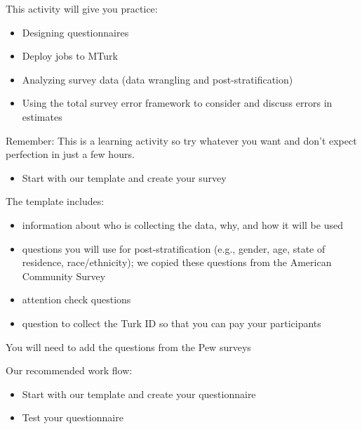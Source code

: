 \documentclass[aspectratio=169]{beamer}
\begin{document}
\begin{frame}

This activity will give you practice:
\begin{itemize}
\item Designing questionnaires
\pause
\item Deploy jobs to MTurk
\pause
\item Analyzing survey data (data wrangling and post-stratification)
\pause
\item Using the total survey error framework to consider and discuss errors in estimates
\pause
\end{itemize}

\vfill
Remember: This is a learning activity so try whatever you want and don't expect perfection in just a few hours.

\end{frame}
\begin{frame}

\begin{itemize}
\item Start with our template and create your survey
\end{itemize}

\end{frame}
\begin{frame}

The template includes:
\begin{itemize}
\item information about who is collecting the data, why, and how it will be used
\pause
\item questions you will use for post-stratification (e.g., gender, age, state of residence, race/ethnicity); we copied these questions from the American Community Survey
\pause
\item attention check questions
\pause
\item question to collect the Turk ID so that you can pay your participants
\end{itemize}

You will need to add the questions from the Pew surveys
\end{frame}
\begin{frame}

Our recommended work flow:
\begin{itemize}
\item Start with our template and create your questionnaire
\item Test your questionnaire
\end{itemize}

\end{frame}
\end{document}
